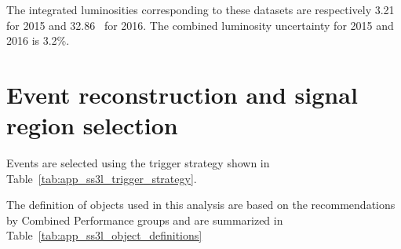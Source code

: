 The integrated luminosities corresponding to these datasets are respectively 3.21~{\ifb} for 2015 and 32.86~{\ifb} for 2016.
The combined luminosity uncertainty for 2015 and 2016 is 3.2\%.


\section{Event reconstruction and signal region selection}
\label{app:ss3l_event_reconstruction_and_SR_selection}
Events are selected using the trigger strategy shown in Table~\ref{tab:app_ss3l_trigger_strategy}.

\begin{table}[htb]
    \caption{The trigger strategy used in the same-sign or three leptons and jets analysis.}
    \label{tab:app_ss3l_trigger_strategy}
\end{table}%

The definition of objects used in this analysis are based on the recommendations by Combined Performance groups and are summarized in Table~\ref{tab:app_ss3l_object_definitions}

